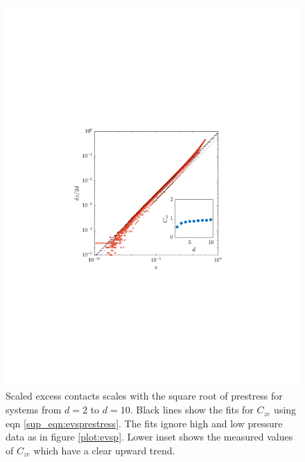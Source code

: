\begin{figure}[h!]
    \includegraphics[width=\columnwidth, trim=143 240 163 250, clip]{excessContactsScaling/prestressvse.pdf}
    \caption{Scaled excess contacts scales with the square root of prestress for systems from $d=2$ to $d=10$. Black lines show the fits for $C_{ze}$ using eqn \ref{sup_eqn:evsprestress}. The fits ignore high and low pressure data as in figure \ref{plot:evsp}. 
    Lower inset shows the measured values of $C_{ze}$ which have a clear upward trend.}
    \label{plot:evsprestress}
\end{figure}


%

